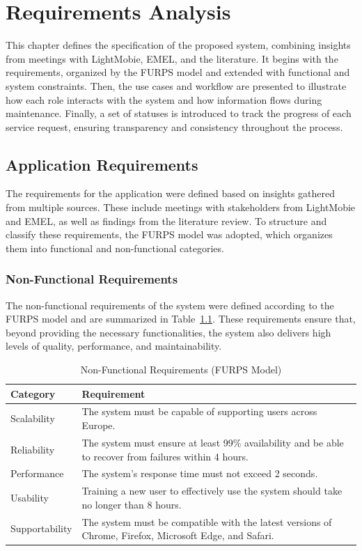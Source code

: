\chapter{Requirements Analysis}%
\label{chapter:requirementsAnalysis}

\begin{introduction}
This chapter defines the specification of the proposed system, combining insights from meetings with LightMobie, EMEL, and the literature. It begins with the requirements, organized by the FURPS model and extended with functional and system constraints. Then, the use cases and workflow are presented to illustrate how each role interacts with the system and how information flows during maintenance. Finally, a set of statuses is introduced to track the progress of each service request, ensuring transparency and consistency throughout the process.
\end{introduction} 




\section{Application Requirements}
The requirements for the application were defined based on insights gathered from multiple sources. These include meetings with stakeholders from LightMobie and EMEL, as well as findings from the literature review. To structure and classify these requirements, the FURPS model was adopted, which organizes them into functional and non-functional categories.

\subsection{Non-Functional Requirements}
The non-functional requirements of the system were defined according to the FURPS model and are summarized in Table~\ref{tab:nfr}. These requirements ensure that, beyond providing the necessary functionalities, the system also delivers high levels of quality, performance, and maintainability.

\begin{table}[htbp]
\centering
\begin{tabular}{|l|p{10cm}|}
\hline
\textbf{Category} & \textbf{Requirement} \\ \hline
Scalability & The system must be capable of supporting users across Europe. \\ \hline
Reliability & The system must ensure at least 99\% availability and be able to recover from failures within 4 hours. \\ \hline
Performance & The system's response time must not exceed 2 seconds. \\ \hline
Usability & Training a new user to effectively use the system should take no longer than 8 hours. \\ \hline
Supportability & The system must be compatible with the latest versions of Chrome, Firefox, Microsoft Edge, and Safari. \\ \hline
\end{tabular} 
\label{tab:nfr}
\caption{Non-Functional Requirements (FURPS Model)}
\end{table}

